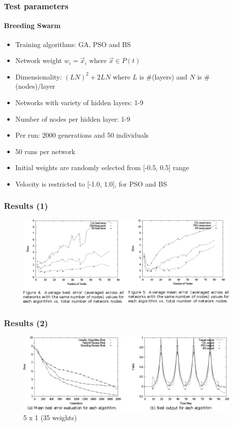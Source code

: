 \documentclass{beamer}
\begin{document}
\begin{frame}[fragile]
  \frametitle{Test parameters}
  \framesubtitle{Breeding Swarm}
  \begin{itemize}
    \item Training algorithms: GA, PSO and BS
    \item Network weight $w_i = \vec{x}_i \mbox{ where } \vec{x} \in P(t)$
    \item Dimensionality: $(LN)^2 + 2LN$ where $L$ is \#(layers) and $N$ is \#(nodes)/layer
    \item Networks with variety of hidden layers: 1-9
    \item Number of nodes per hidden layer: 1-9
    \item Per run: 2000 generations and 50 individuals
    \item 50 runs per network
    \item Initial weights are randomly selected from [-0.5, 0.5] range
    \item Velocity is restricted to [-1.0, 1.0], for PSO and BS
  \end{itemize}
\end{frame}
\begin{frame}[fragile]
  \frametitle{Results (1)}
  \begin{figure}
   \includegraphics[scale=0.7]{results1}
  \end{figure}
\end{frame}
\begin{frame}[fragile]
  \frametitle{Results (2)}
  \begin{figure}
   \includegraphics[scale=0.7]{results2}
   \caption{5 x 1 (35 weights)}
  \end{figure}
\end{frame}
\end{document}
